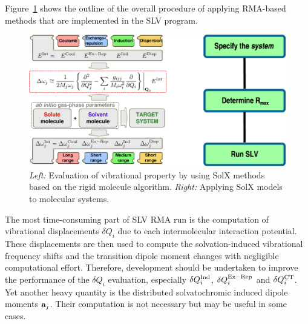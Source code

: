 \documentclass[a4paper,titlepage,twoside,fleqn,12pt]{book}
\begin{document}
\begin{refsection}
Figure~\ref{f:slv-solefp} shows the outline of the overall procedure 
of applying RMA\hyp{}based methods that are implemented in the SLV program.
%
\begin{figure}[t!]
\centering
\setlength\fboxsep{0.4pt}
\setlength\fboxrule{0.5pt}
\includegraphics[width=0.92\linewidth]{slv-fig-2.eps}
\caption{
\emph{Left:} Evaluation of vibrational property by using SolX methods based 
             on the rigid molecule algorithm.
\emph{Right:} Applying SolX models to molecular systems.
\label{f:slv-solefp}}
\end{figure}
%
The most time\hyp{}consuming part of SLV RMA run is the computation
of vibrational displacements $\delta Q_i$ due to each intermolecular
interaction potential. These displacements are then used to compute the
solvation\hyp{}induced vibrational frequency shifts 
and the transition dipole moment changes with negligible computational effort.
Therefore, development should be undertaken to improve the
performance of the $\delta Q_i$ evaluation, especially 
$\delta Q_i^{\rm Ind}$, $\delta Q_i^{\rm Ex-Rep}$
and $\delta Q_i^{\rm CT}$. Yet another heavy quantity is
the distributed solvatochromic induced dipole moments ${\bf a}_j$.
Their computation is not necessary but may be useful in some cases.


\end{refsection}
\end{document}
